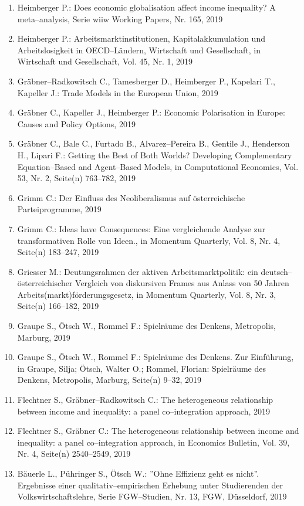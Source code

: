 \begin{enumerate}
	 \item Heimberger P.: Does economic globalisation affect income inequality? A meta--analysis, Serie wiiw Working Papers, Nr. 165, 2019
	 \item Heimberger P.: Arbeitsmarktinstitutionen, Kapitalakkumulation und Arbeitslosigkeit in OECD--Ländern, Wirtschaft und Gesellschaft, in Wirtschaft und Gesellschaft, Vol. 45, Nr. 1, 2019
	 \item Gräbner--Radkowitsch C., Tamesberger D., Heimberger P., Kapelari T., Kapeller J.: Trade Models in the European Union, 2019
	 \item Gräbner C., Kapeller J., Heimberger P.: Economic Polarisation in Europe: Causes and Policy Options, 2019
	 \item Gräbner C., Bale C., Furtado B., Alvarez--Pereira B., Gentile J., Henderson H., Lipari F.: Getting the Best of Both Worlds? Developing Complementary Equation--Based and Agent--Based Models, in Computational Economics, Vol. 53, Nr. 2, Seite(n) 763--782, 2019
	 \item Grimm C.: Der Einfluss des Neoliberalismus auf österreichische Parteiprogramme, 2019
	 \item Grimm C.: Ideas have Consequences: Eine vergleichende Analyse zur transformativen Rolle von Ideen., in Momentum Quarterly, Vol. 8, Nr. 4, Seite(n) 183--247, 2019
	 \item Griesser M.: Deutungsrahmen der aktiven Arbeitsmarktpolitik: ein deutsch--österreichischer Vergleich von diskursiven Frames aus Anlass von 50 Jahren Arbeits(markt)förderungsgesetz, in Momentum Quarterly, Vol. 8, Nr. 3, Seite(n) 166--182, 2019
	 \item Graupe S., Ötsch W., Rommel F.: Spielräume des Denkens, Metropolis, Marburg, 2019
	 \item Graupe S., Ötsch W., Rommel F.: Spielräume des Denkens. Zur Einführung, in Graupe, Silja; Ötsch, Walter O.; Rommel, Florian: Spielräume des Denkens, Metropolis, Marburg, Seite(n) 9--32, 2019
	 \item Flechtner S., Gräbner--Radkowitsch C.: The heterogeneous relationship between income and inequality: a panel co--integration approach, 2019
	 \item Flechtner S., Gräbner C.: The heterogeneous relationship between income and inequality: a panel co--integration approach, in Economics Bulletin, Vol. 39, Nr. 4, Seite(n) 2540–2549, 2019
	 \item Bäuerle L., Pühringer S., Ötsch W.: ''Ohne Effizienz geht es nicht''. Ergebnisse einer qualitativ--empirischen Erhebung unter Studierenden der Volkswirtschaftslehre, Serie FGW--Studien, Nr. 13, FGW, Düsseldorf, 2019

\end{enumerate}
